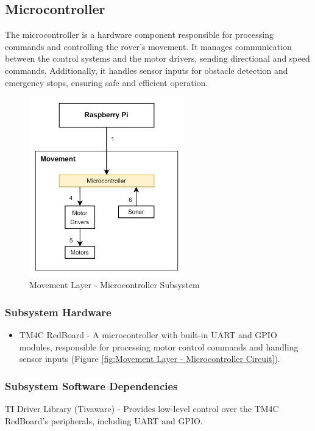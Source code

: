 
\subsection{Microcontroller}
The microcontroller \cite{TM4C} is a hardware component responsible for processing commands and controlling the rover's movement. It manages communication between the control systems and the motor drivers, sending directional and speed commands. Additionally, it handles sensor inputs for obstacle detection and emergency stops, ensuring safe and efficient operation.

\begin{figure}[h!]
	\centering
 	\includegraphics[width=0.60\textwidth]{images/movement/1_microcontroller.jpg}
 \caption{Movement Layer - Microcontroller Subsystem}
\end{figure}

\subsubsection{Subsystem Hardware}
\begin{itemize}
    \item TM4C RedBoard - A microcontroller with built-in UART and GPIO modules, responsible for processing motor control commands and handling sensor inputs (Figure \ref{fig:Movement Layer - Microcontroller Circuit}).
\end{itemize}

\subsubsection{Subsystem Software Dependencies}
TI Driver Library (Tivaware) - Provides low-level control over the TM4C RedBoard's peripherals, including UART and GPIO.

